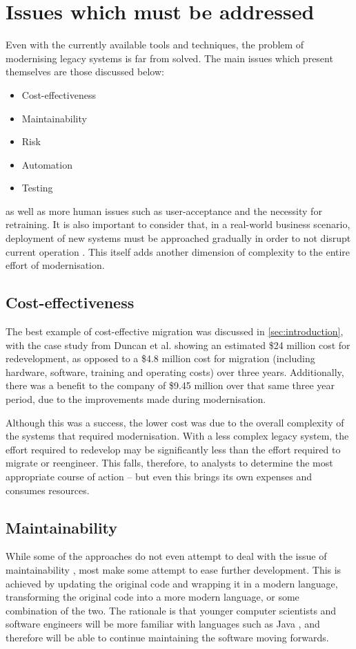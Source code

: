 \documentclass[12pt,journal,compsoc]{IEEEtran}
\begin{document}
\section{Issues which must be addressed}
\label{sec:issues}
Even with the currently available tools and techniques, the problem of modernising legacy systems is far from solved. The main issues which present themselves are those discussed below:
\begin{itemize}
\item Cost-effectiveness
\item Maintainability
\item Risk
\item Automation
\item Testing
\end{itemize}
as well as more human issues such as user-acceptance and the necessity for retraining. It is also important to consider that, in a real-world business scenario, deployment of new systems must be approached gradually in order to not disrupt current operation \cite{Sneed2008,Duncan1996,Almonaies2010}. This itself adds another dimension of complexity to the entire effort of modernisation.

\subsection{Cost-effectiveness}
\label{subsec:costeffectiveness}
The best example of cost-effective migration was discussed in \autoref{sec:introduction}, with the case study from Duncan et al. \cite{Duncan1996} showing an estimated \$24 million cost for redevelopment, as opposed to a \$4.8 million cost for migration (including hardware, software, training and operating costs) over three years. Additionally, there was a benefit to the company of \$9.45 million over that same three year period, due to the improvements made during modernisation.

Although this was a success, the lower cost was due to the overall complexity of the systems that required modernisation. With a less complex legacy system, the effort required to redevelop may be significantly less than the effort required to migrate or reengineer. This falls, therefore, to analysts to determine the most appropriate course of action -- but even this brings its own expenses and consumes resources.

\subsection{Maintainability}
\label{subsec:maintainability}
While some of the approaches do not even attempt to deal with the issue of maintainability \cite{Stroulia2002}, most make some attempt to ease further development. This is achieved by updating the original code and wrapping it in a modern language, transforming the original code into a more modern language, or some combination of the two. The rationale is that younger computer scientists and software engineers will be more familiar with languages such as Java \cite{Sneed2013}, and therefore will be able to continue maintaining the software moving forwards.
\end{document}
